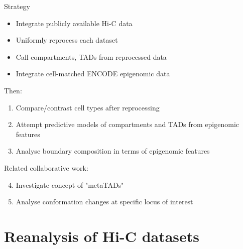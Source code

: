 \documentclass{beamer}
\begin{document}
\begin{frame}{ Strategy }

{\small

\begin{itemize}
\item Integrate publicly available Hi-C data
\item Uniformly reprocess each dataset 
\item Call compartments, TADs from reprocessed data
\item Integrate cell-matched ENCODE epigenomic data
\end{itemize}

Then:
\begin{enumerate}
\item Compare/contrast cell types after reprocessing
\item Attempt predictive models of compartments and TADs from epigenomic features
\item Analyse boundary composition in terms of epigenomic features
\end{enumerate}

Related collaborative work:
\begin{enumerate}
\setcounter{enumi}{3}
\item Investigate concept of "metaTADs"
\item Analyse conformation changes at specific locus of interest 
\end{enumerate}
}

\end{frame}



\section{Reanalysis of Hi-C datasets}
\end{document}
